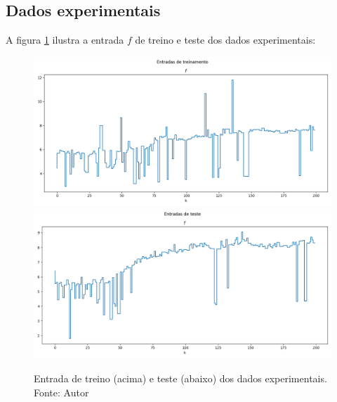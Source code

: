 \subsection{Dados experimentais}
A figura \ref{fig:exp_inputs_raw} ilustra a entrada $f$ de treino e teste dos dados experimentais:
\begin{figure}[hbt!]
    \centering
    \includegraphics[width=0.8\linewidth]{Imagens/chap04/experiment_inputs_train_raw.png}
    \hfill
    \includegraphics[width=0.8\linewidth]{Imagens/chap04/experiment_inputs_test_raw.png}
    \caption{Entrada de treino (acima) e teste (abaixo) dos dados experimentais. Fonte: Autor}
    \label{fig:exp_inputs_raw}
\end{figure}

